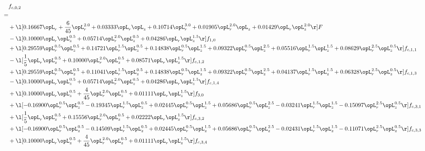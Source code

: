 \begin{alignat}{2} 
\label{eq:f_02_1} 
& f_{c,0,2} \nonumber \\ 
 = \\ 
& + \l[  0.16667 \opL_r + \frac{6}{45} \opL_r^{2.0} +  0.03333 \opL_r \opL_z +  0.10714 \opL_r^{3.0} +  0.01905 \opL_r^{2.0} \opL_z +  0.01429 \opL_r \opL_z^{2.0}  \r] F \nonumber \\ 
& - \l[  0.10000 \opL_r \opL_z^{0.5} +  0.05714 \opL_r^{2.0} \opL_z^{0.5} +  0.04286 \opL_r \opL_z^{1.5}  \r] f_{1,0} \nonumber \\ 
& + \l[  0.29559 \opL_r^{0.5} \opL_z^{0.5} +  0.14721 \opL_r^{1.5} \opL_z^{0.5} +  0.14838 \opL_r^{0.5} \opL_z^{1.5} +  0.09322 \opL_r^{0.5} \opL_z^{2.5} +  0.05516 \opL_r^{1.5} \opL_z^{1.5} +  0.08629 \opL_r^{2.5} \opL_z^{0.5}  \r] f_{c,1,1} \nonumber \\ 
& - \l[ \frac{1}{5} \opL_r \opL_z^{0.5} +  0.10000 \opL_r^{2.0} \opL_z^{0.5} +  0.08571 \opL_r \opL_z^{1.5}  \r] f_{c,1,2} \nonumber \\ 
& + \l[  0.29559 \opL_r^{0.5} \opL_z^{0.5} +  0.11041 \opL_r^{1.5} \opL_z^{0.5} +  0.14838 \opL_r^{0.5} \opL_z^{1.5} +  0.09322 \opL_r^{0.5} \opL_z^{2.5} +  0.04137 \opL_r^{1.5} \opL_z^{1.5} +  0.06328 \opL_r^{2.5} \opL_z^{0.5}  \r] f_{c,1,3} \nonumber \\ 
& - \l[  0.10000 \opL_r \opL_z^{0.5} +  0.05714 \opL_r^{2.0} \opL_z^{0.5} +  0.04286 \opL_r \opL_z^{1.5}  \r] f_{c,1,4} \nonumber \\ 
& + \l[  0.10000 \opL_r \opL_z^{0.5} + \frac{4}{45} \opL_r^{2.0} \opL_z^{0.5} +  0.01111 \opL_r \opL_z^{1.5}  \r] f_{3,0} \nonumber \\ 
& + \l[  -0.16900 \opL_r^{0.5} \opL_z^{0.5}   -0.19345 \opL_r^{1.5} \opL_z^{0.5} +  0.02445 \opL_r^{0.5} \opL_z^{1.5} +  0.05686 \opL_r^{0.5} \opL_z^{2.5}   -0.03241 \opL_r^{1.5} \opL_z^{1.5}   -0.15097 \opL_r^{2.5} \opL_z^{0.5}  \r] f_{c,3,1} \nonumber \\ 
& + \l[ \frac{1}{5} \opL_r \opL_z^{0.5} +  0.15556 \opL_r^{2.0} \opL_z^{0.5} +  0.02222 \opL_r \opL_z^{1.5}  \r] f_{c,3,2} \nonumber \\ 
& + \l[  -0.16900 \opL_r^{0.5} \opL_z^{0.5}   -0.14509 \opL_r^{1.5} \opL_z^{0.5} +  0.02445 \opL_r^{0.5} \opL_z^{1.5} +  0.05686 \opL_r^{0.5} \opL_z^{2.5}   -0.02431 \opL_r^{1.5} \opL_z^{1.5}   -0.11071 \opL_r^{2.5} \opL_z^{0.5}  \r] f_{c,3,3} \nonumber \\ 
& + \l[  0.10000 \opL_r \opL_z^{0.5} + \frac{4}{45} \opL_r^{2.0} \opL_z^{0.5} +  0.01111 \opL_r \opL_z^{1.5}  \r] f_{c,3,4} \nonumber \\ 

\end{alignat}
